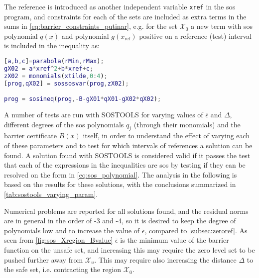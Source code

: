 The reference is introduced as another independent variable \texttt{xref} in the \gls{sos} program, and constraints for each of the sets are included as extra terms in the sums in \autoref{eq:barrier_constraints_putinar}, e.g. for the set $\mathcal{X}_0$ a new term with \gls{sos} polynomial $q(x)$ and polynomial $g(x_\text{ref})$ positive on a reference (test) interval is included in the inequality as:
\begin{lstlisting}[language=matlab]
% Constraint on the set X0 being nonpositive for the interval of references 
[a,b,c]=parabola(rMin,rMax);
gX02 = a*xref^2+b*xref+c;
zX02 = monomials(xtilde,0:4);
[prog,qX02] = sossosvar(prog,zX02);

prog = sosineq(prog,-B-gX01*qX01-gX02*qX02);
\end{lstlisting}

A number of tests are run with SOSTOOLS for varying values of $\bar{\epsilon}$ and $\Delta$, different degrees of the \gls{sos} polynomials $q_j$ (through their monomials) and the barrier certificate $B(x)$ itself, in order to understand the effect of varying each of these parameters and to test for which intervals of references a solution can be found.
A solution found with SOSTOOLS is considered valid if it passes the test that each of the expressions in the inequalities are \gls{sos} by testing if they can be resolved on the form in \autoref{eq:sos_polynomial}. The analysis in the following is based on the results for these solutions, with the conclusions summarized in \autoref{tab:sostools_varying_param}.

Numerical problems are reported for all solutions found, and the residual norms are in general in the order of -3 and -4, so it is desired to keep the degree of polynomials low and to increase the value of $\bar{\epsilon}$, compared to \autoref{subsec:zeroref}. As seen from \autoref{fig:sos_Xregion_Bvalue} $\bar{\epsilon}$ is the minimum value of the barrier function on the unsafe set, and increasing this may require the zero level set to be pushed further away from $\mathcal{X}_u$. This may require also increasing the distance $\Delta$ to the safe set, i.e. contracting the region $\mathcal{X}_0$.

